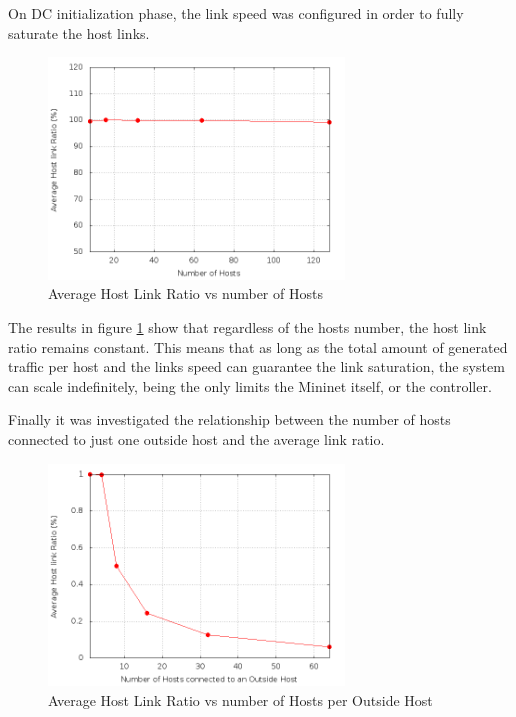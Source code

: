 \documentclass[12pt,english,oneside]{book}
\begin{document}
On DC initialization phase, the link speed was configured in order to fully saturate the host links.

\begin{figure}[h!tbp]
        \centering
        \includegraphics[width=0.7\textwidth]{figures/topo.png}
        \caption{Average Host Link Ratio vs number of Hosts}
        \label{fig:topo}
\end{figure}

The results in figure \ref{fig:topo} show that regardless of the hosts number, the host link ratio remains constant.
This means that as long as the total amount of generated traffic per host and the links speed can guarantee the link saturation, the system can scale indefinitely, being the only limits the Mininet itself, or the controller.

Finally it was investigated the relationship between the number of hosts connected to just one outside host and the average link ratio.

\newpage

\begin{figure}[h!tbp]
        \centering
        \includegraphics[width=0.7\textwidth]{figures/out_hosts_ratio.png}
        \caption{Average Host Link Ratio vs number of Hosts per Outside Host}
        \label{fig:hosts}
\end{figure}
\end{document}
